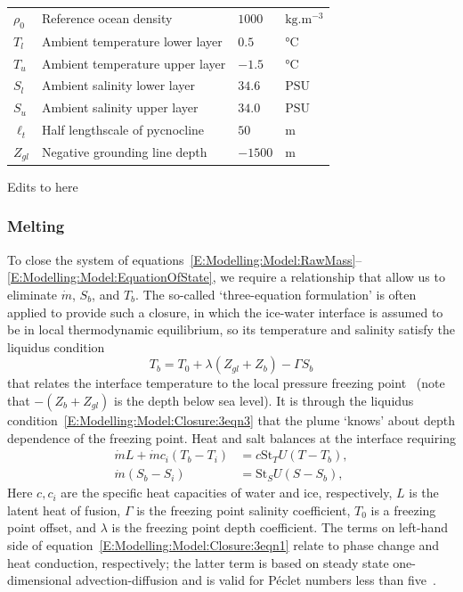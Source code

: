 \documentclass[openacc]{rsproca_new}%
\newcommand{\red}[1]{{\color{red} #1}}
\begin{document}
\begin{table}[!h]
\begin{center}
\begin{tabular}{llll}
$\rho_0$ &  Reference ocean density & $1000$ & $\si{\kilogram . \meter^{-3}}$\\
$T_{l}$ & Ambient temperature lower layer &$0.5$        &  $\si{ \celsius}$   \\
$T_{u}$ & Ambient temperature upper layer &$-1.5$        &  $\si{ \celsius}$  \\
$S_{l}$ & Ambient salinity lower layer &$34.6$        &  $\text{PSU}$   \\
$S_{u}$ & Ambient salinity upper layer &$34.0$        &  $\text{PSU}$  \\
$\ell_t$ & Half lengthscale of pycnocline & $50$ & $\si{\meter}$\\
$Z_{gl}$ & Negative grounding line depth & $-1500$ & $\si{\meter}$\\

\hline
\end{tabular}
\end{center}
\vspace*{-4pt}
\end{table}

\red{Edits to here}

\subsubsection{Melting}
To close the system of equations~\eqref{E:Modelling:Model:RawMass}--\eqref{E:Modelling:Model:EquationOfState}, we require a relationship that allow us to eliminate $\dot{m}$, $S_b$, and $T_b$.  The so-called `three-equation formulation' is often applied to provide such a closure, in which the ice-water interface is assumed to be in local thermodynamic equilibrium, so its temperature and salinity satisfy the liquidus condition 
\begin{equation}
    T_b = T_0 + \lambda (Z_{gl} + Z_b) - \Gamma S_b\label{E:Modelling:Model:Closure:3eqn3}
\end{equation}
that relates the interface temperature to the local pressure freezing point~\citep{Holland1999JPhysOcean} (note that $-(Z_b + Z_{gl})$ is the depth below sea level). It is through the liquidus condition~\eqref{E:Modelling:Model:Closure:3eqn3} that the plume `knows' about depth dependence of the freezing point. Heat and salt balances at the interface requiring
\begin{align}
\dot{m}L + \dot{m}c_i (T_b - T_i) &= c \mathrm{St}_T U(T - T_b),\label{E:Modelling:Model:Closure:3eqn1}\\
\dot{m}(S_b - S_i) &= \mathrm{St}_S U(S - S_b),\label{E:Modelling:Model:Closure:3eqn2}
\end{align}  
Here $c, c_i$ are the specific heat capacities of water and ice, respectively, $L$ is the latent heat of fusion, $\Gamma$ is the freezing point salinity coefficient,  $T_0$ is a freezing point offset, and $\lambda$ is the freezing point depth coefficient. The terms on left-hand side of equation~\eqref{E:Modelling:Model:Closure:3eqn1} relate to phase change and heat conduction, respectively; the latter term is based on steady state one-dimensional advection-diffusion and is valid for P\'{e}clet numbers less than five~\citep{Holland1999JPhysOcean}.
\end{document}
